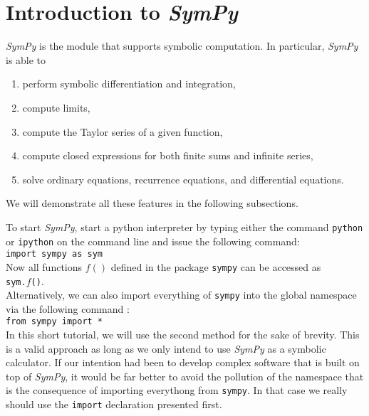 \documentclass{report}
\begin{document}
\chapter{Introduction to \textsl{SymPy}}
\textsl{SymPy} is the module that supports symbolic computation.  In particular, \textsl{SymPy} is able to
\begin{enumerate}
\item perform symbolic differentiation and integration,
\item compute limits,
\item compute the Taylor series of a given function,
\item compute closed expressions for both finite sums and infinite  series,
\item solve ordinary equations, recurrence equations, and differential equations.
\end{enumerate}
We will demonstrate all these features in the following subsections.

To start \textsl{SymPy}, start a python interpreter by typing either the command \texttt{python} or \texttt{ipython} 
on the command line and issue the following command:
\\[0.2cm]
\hspace*{1.3cm}
\texttt{import sympy as sym}
\\[0.2cm]
Now all functions $f()$ defined in the package \texttt{sympy} can be accessed as
\\[0.2cm]
\hspace*{1.3cm}
\texttt{sym.$f$()}.
\\[0.2cm]
Alternatively, we can also import everything of \texttt{sympy} into the global namespace via the
following command :
\\[0.2cm]
\hspace*{1.3cm}
\texttt{from sympy import *}
\\[0.2cm]
In this short tutorial, we will use the second method for the sake of brevity.  This is a valid
approach as long as we only intend to use \textsl{SymPy} as a symbolic calculator.  If our intention
had been to develop complex software that is built on top of \textsl{SymPy}, it would be far better
to avoid the pollution of the namespace that is the consequence of importing everythong from
\texttt{sympy}.  In that case we really should use the \texttt{import} declaration presented first.
\end{document}
